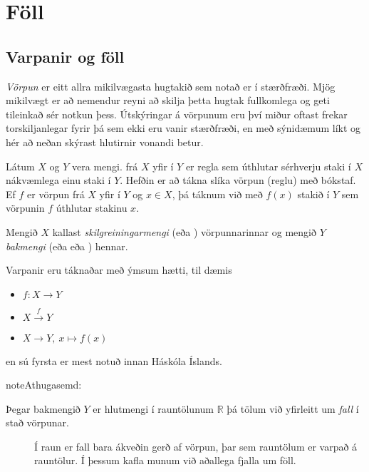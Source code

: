 \documentclass[a4paper,10pt,icelandic]{sphinxmanual}
\begin{document}
\chapter{Föll}
\label{\detokenize{Kafli05:foll}}\label{\detokenize{Kafli05::doc}}

\section{Varpanir og föll}
\label{\detokenize{Kafli05:varpanir-og-foll}}
\textit{Vörpun} er eitt allra mikilvægasta hugtakið sem notað er í stærðfræði.
Mjög mikilvægt er að nemendur reyni að skilja þetta hugtak fullkomlega og geti tileinkað sér notkun þess.
Útskýringar á vörpunum eru því miður oftast frekar torskiljanlegar fyrir þá sem ekki eru vanir stærðfræði, en með sýnidæmum líkt og hér að neðan skýrast hlutirnir vonandi betur.

Látum \(X\) og \(Y\) vera mengi.  frá \(X\) yfir í \(Y\) er regla sem úthlutar sérhverju staki í \(X\) nákvæmlega einu staki í \(Y\). Hefðin er að tákna slíka vörpun (reglu) með bókstaf.
Ef \(f\) er vörpun frá \(X\) yfir í \(Y\) og \(x \in X\), þá táknum við með \(f(x)\) stakið í \(Y\) sem vörpunin \(f\) úthlutar stakinu \(x\).

Mengið \(X\) kallast \textit{skilgreiningarmengi} (eða ) vörpunnarinnar og mengið \(Y\) \textit{bakmengi} (eða  eða ) hennar.

Varpanir eru táknaðar með ýmsum hætti, til dæmis
\begin{itemize}
\item {} 
\(f: X\to Y\)

\item {} 
\(X \overset{f} \to Y\)

\item {} 
\(X\to Y, \ x\mapsto f(x)\)

\end{itemize}

en sú fyrsta er mest notuð innan Háskóla Íslands.


\begin{sphinxadmonition}{note}{Athugasemd:}\begin{description}
\item[{Þegar bakmengið \(Y\) er hlutmengi í rauntölunum \(\mathbb{R}\) þá tölum við yfirleitt um \textit{fall} í stað vörpunar.}] \leavevmode
Í raun er fall bara ákveðin gerð af vörpun, þar sem rauntölum er varpað á rauntölur.
Í þessum kafla munum við aðallega fjalla um föll.

\end{description}
\end{sphinxadmonition}
\end{document}
